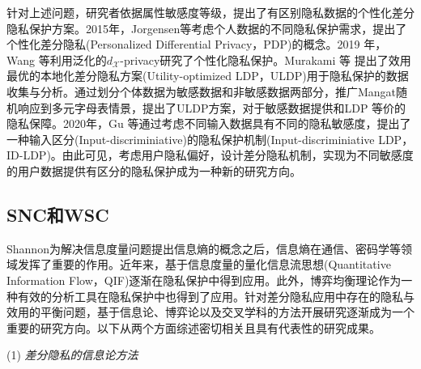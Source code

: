 针对上述问题，研究者依据属性敏感度等级，提出了有区别隐私数据的个性化差分隐私保护方案\cite{chen2016private}。2015年，Jorgensen等\cite{jorgensen2015conservative}考虑个人数据的不同隐私保护需求，提出了个性化差分隐私(Personalized Differential Privacy，PDP)的概念。2019 年，Wang 等\cite{wang2019personalized}利用泛化的$d_{\mathcal{X}}$-privacy\cite{chatzikokolakis2013broadening}研究了个性化隐私保护。Murakami 等\cite{murakami2019utility} 提出了效用最优的本地化差分隐私方案(Utility-optimized LDP，ULDP)用于隐私保护的数据收集与分析。通过划分个体数据为敏感数据和非敏感数据两部分，推广Mangat\cite{mangat1994an}随机响应到多元字母表情景，提出了ULDP方案，对于敏感数据提供和LDP 等价的隐私保障。2020年，Gu 等\cite{gu2020providing}通过考虑不同输入数据具有不同的隐私敏感度，提出了一种输入区分(Input-discriminiative)的隐私保护机制(Input-discriminiative LDP，ID-LDP)。由此可见，考虑用户隐私偏好，设计差分隐私机制，实现为不同敏感度的用户数据提供有区分的隐私保护成为一种新的研究方向。


\subsection{SNC和WSC}
Shannon\cite{shannon1948a}为解决信息度量问题提出信息熵的概念之后，信息熵在通信、密码学等领域发挥了重要的作用。近年来，基于信息度量的量化信息流思想(Quantitative Information Flow，QIF)\cite{smith2009on}逐渐在隐私保护中得到应用。此外，博弈均衡理论作为一种有效的分析工具在隐私保护中也得到了应用。针对差分隐私应用中存在的隐私与效用的平衡问题，基于信息论、博弈论以及交叉学科的方法开展研究逐渐成为一个重要的研究方向。以下从两个方面综述密切相关且具有代表性的研究成果。

(1) {\em 差分隐私的信息论方法}\label{subsec:information_dp}

